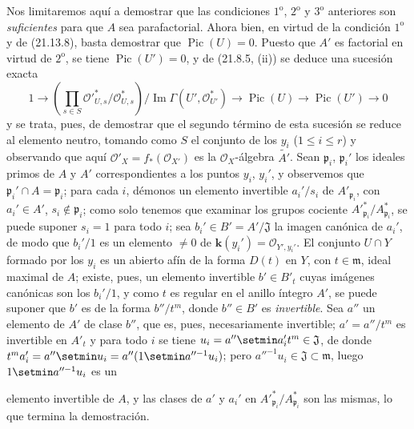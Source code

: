 \begin{env}[21.13.9]
Nos limitaremos aquí a demostrar que las condiciones $1^{\mathrm o}$,
$2^{\mathrm o}$ y $3^{\mathrm o}$ anteriores son \emph{suficientes} para que $A$ sea
parafactorial. Ahora bien, en virtud de la condición $1^{\mathrm o}$ y de (21.13.8), basta
demostrar que $\operatorname{Pic}(U)=0$. Puesto que $A'$ es factorial en virtud de
$2^{\mathrm o}$, se tiene $\operatorname{Pic}(U')=0$, y de (21.8.5, (ii)) se deduce una
sucesión exacta
\[
  1\longrightarrow
  \left(\prod_{s\in S}
  \mathcal O'^*_{U,s}/\mathcal O^*_{U,s}\right)
  \big/\operatorname{Im}\Gamma(U',\mathcal O_{U'}^*)
  \longrightarrow\operatorname{Pic}(U)\longrightarrow\operatorname{Pic}(U')
  \longrightarrow0
\]
y se trata, pues, de demostrar que el segundo término de esta sucesión se reduce al elemento
neutro, tomando como $S$ el conjunto de los $y_i$ ($1\leq i\leq r$) y observando
que aquí $\mathcal O'_X=f_*(\mathcal O_{X'})$ es la $\mathcal O_X$-álgebra $\widetilde{A'}$. Sean
$\mathfrak p_i$, $\mathfrak p_i'$ los ideales primos de $A$ y $A'$ correspondientes
a los puntos $y_i$, $y_i'$, y observemos que $\mathfrak p_i'\cap A=\mathfrak p_i$;
para cada $i$, démonos un elemento invertible $a_i'/s_i$ de
$A'_{\mathfrak p_i}$, con $a_i'\in A'$, $s_i\notin\mathfrak p_i$; como solo
tenemos que examinar los grupos cociente
$A'^*_{\mathfrak p_i}/A^*_{\mathfrak p_i}$, se puede suponer $s_i=1$ para todo
$i$; sea $b_i'\in B'=A'/\mathfrak J$ la imagen canónica de $a_i'$, de modo que
$b_i'/1$ es un elemento $\neq0$ de $\boldsymbol{k}(y_i')=\mathcal O_{Y',y_i'}$. El conjunto
$U\cap Y$ formado por los $y_i$ es un abierto afín de la forma $D(t)$ en $Y$, con
$t\in\mathfrak m$, ideal maximal de $A$; existe, pues, un elemento invertible
$b'\in B'_t$ cuyas imágenes canónicas son los $b_i'/1$, y como $t$ es regular
en el anillo íntegro $A'$, se puede suponer que $b'$ es de la forma $b''/t^m$, donde
$b''\in B'$ es \emph{invertible}. Sea $a''$ un elemento de $A'$ de clase $b''$, que
es, pues, necesariamente invertible; $a'=a''/t^m$ es invertible en $A'_t$ y para
todo $i$ se tiene
$u_i=a''\setmin a_i't^m\in\mathfrak J$, de donde $t^m a_i'=a''\setmin u_i=a''(1\setmin a''^{-1}u_i)$;
pero $a''^{-1}u_i\in\mathfrak J\subset\mathfrak m$, luego $1\setmin a''^{-1}u_i$ es un

elemento invertible de $A$, y las clases de $a'$ y $a_i'$ en
$A'^*_{\mathfrak p_i}/A^*_{\mathfrak p_i}$ son las mismas, lo que termina la
demostración.



\end{env}
